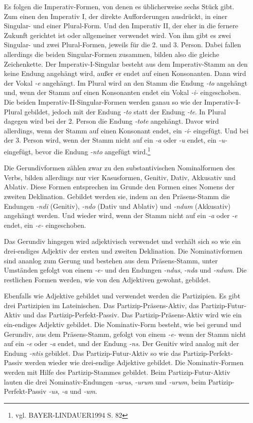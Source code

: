 \documentclass[12pt,abstract=on]{scrreprt}
\begin{document}
Es folgen die Imperativ-Formen, von denen es üblicherweise sechs Stück gibt. Zum einen den Imperativ I, der direkte Aufforderungen ausdrückt, in einer Singular- und einer Plural-Form. Und den Imperativ II, der eher in die fernere Zukunft gerichtet ist oder allgemeiner verwendet wird. Von ihm gibt es zwei Singular- und zwei Plural-Formen, jeweils für die 2. und 3. Person. Dabei fallen allerdings die beiden Singular-Formen zusammen, bilden also die gleiche Zeichenkette. Der Imperativ-I-Singular besteht aus dem Imperativ-Stamm an den keine Endung angehängt wird, außer er endet auf einen Konsonanten. Dann wird der Vokal \textit{-e} angehängt. Im Plural wird an den Stamm die Endung \textit{-to} angehängt und, wenn der Stamm auf einen Konsonanten endet ein Vokal \textit{-i-} eingeschoben. Die beiden Imperativ-II-Singular-Formen werden ganau so wie der Imperativ-I-Plural gebildet, jedoch mit der Endung \textit{-to} statt der Endung \textit{-te}. In Plural dagegen wird bei der 2. Person die Endung \textit{-tote} angehängt. Davor wird allerdings, wenn der Stamm auf einen Konsonant endet, ein \textit{-i-} eingefügt. Und bei der 3. Person wird, wenn der Stamm nicht auf ein \textit{-a} oder \textit{-u} endet, ein \textit{-u-} eingefügt, bevor die Endung \textit{-nto} angefügt wird.\footnote{vgl. BAYER-LINDAUER1994 S. 82} \par
Die Gerundivformen zählen zwar zu den substantivischen Nominalformen des Verbs, bilden allerdings nur vier Kasusformen, Genitiv, Dativ, Akkusativ und Ablativ. Diese Formen entsprechen im Grunde den Formen eines Nomens der zweiten Deklination. Gebildet werden sie, indem an den Präsens-Stamm die Endungen \textit{-ndi} (Genitiv), \textit{-ndo} (Dativ und Ablativ) und \textit{-ndum} (Akkusativ) angehängt werden. Und wieder wird, wenn der Stamm nicht auf ein \textit{-a} oder \textit{-e} endet, ein \textit{-e-} eingeschoben.\par
Das Gerundiv hingegen wird adjektivisch verwendet und verhält sich so wie ein drei-endiges Adjektiv der ersten und zweiten Deklination. Die Nominativformen sind ananlog zum Gerung und bestehen aus dem Präsens-Stamm, unter Umständen gefolgt von einem \textit{-e-} und den Endungen \textit{-ndus}, \textit{-nda} und \textit{-ndum}. Die restlichen Formen werden, wie von den Adjektiven gewohnt, gebildet.\par
Ebenfalls wie Adjektive gebildet und verwendet werden die Partizipien. Es gibt drei Partizipien im Lateinischen. Das Partizip-Präsens-Aktiv, das Partizip-Futur-Aktiv und das Partizip-Perfekt-Passiv. Das Partizip-Präsens-Aktiv wird wie ein ein-endiges Adjektiv gebildet. Die Nominativ-Form besteht, wie bei gerund und Gerundiv, aus dem Präsens-Stamm, gefolgt von einem \textit{-e-} wenn der Stamm nicht auf ein \textit{-e} oder \textit{-a} endet, und der Endung \textit{-ns}. Der Genitiv wird analog mit der Endung \textit{-ntis} gebildet. Das Partizip-Futur-Aktiv so wie das Partizip-Perfekt-Passiv werden wieder wie drei-endige Adjektive gebildet. Die Nominativ-Formen werden mit Hilfe des Partizip-Stammes gebildet. Beim Partizip-Futur-Aktiv lauten die drei Nominativ-Endungen \textit{-urus}, \textit{-urum} und \textit{-urum}, beim Partizip-Perfekt-Passiv \textit{-us}, \textit{-a} und \textit{-um}.
\end{document}
